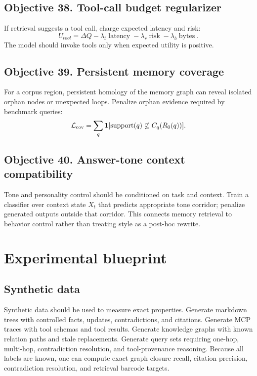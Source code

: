 \documentclass[11pt]{article}
\theoremstyle{definition}
\theoremstyle{remark}
\begin{document}
\subsection{Objective 38. Tool-call budget regularizer}
If retrieval suggests a tool call, charge expected latency and risk:
\[
    U_{tool}=\Delta Q-\lambda_t\operatorname{latency}-\lambda_r\operatorname{risk}-\lambda_b\operatorname{bytes}.
\]
The model should invoke tools only when expected utility is positive.

\subsection{Objective 39. Persistent memory coverage}
For a corpus region, persistent homology of the memory graph can reveal isolated orphan nodes or unexpected loops. Penalize orphan evidence required by benchmark queries:
\[
    \mathcal L_{\rm cov}=\sum_q \mathbf 1[\operatorname{support}(q)\not\subseteq C_q(R_0(q))].
\]

\subsection{Objective 40. Answer-tone context compatibility}
Tone and personality control should be conditioned on task and context. Train a classifier over context state \(X_t\) that predicts appropriate tone corridor; penalize generated outputs outside that corridor. This connects memory retrieval to behavior control rather than treating style as a post-hoc rewrite.

\section{Experimental blueprint}

\subsection{Synthetic data}

Synthetic data should be used to measure exact properties. Generate markdown trees with controlled facts, updates, contradictions, and citations. Generate MCP traces with tool schemas and tool results. Generate knowledge graphs with known relation paths and stale replacements. Generate query sets requiring one-hop, multi-hop, contradiction resolution, and tool-provenance reasoning. Because all labels are known, one can compute exact graph closure recall, citation precision, contradiction resolution, and retrieval barcode targets.
\end{document}
